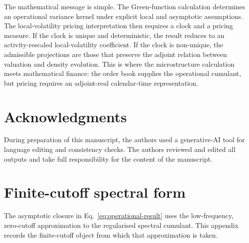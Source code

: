 \documentclass[11pt]{amsart}
\theoremstyle{definition}
\theoremstyle{plain}
\theoremstyle{remark}
\begin{document}
The mathematical message is simple. The Green-function calculation determines an operational variance kernel under explicit local and asymptotic assumptions. The local-volatility pricing interpretation then requires a clock and a pricing measure. If the clock is unique and deterministic, the result reduces to an activity-rescaled local-volatility coefficient. If the clock is non-unique, the admissible projections are those that preserve the adjoint relation between valuation and density evolution. This is where the microstructure calculation meets mathematical finance: the order book supplies the operational cumulant, but pricing requires an adjoint-real calendar-time representation.

\section*{Acknowledgments}
During preparation of this manuscript, the authors used a generative-AI tool for language editing and consistency checks. The authors reviewed and edited all outputs and take full responsibility for the content of the manuscript.




\appendix
\section{Finite-cutoff spectral form}
\label{app:finite-cutoff}
The asymptotic closure in Eq.~\eqref{eq:operational-result} uses the low-frequency, zero-cutoff approximation to the regularised spectral cumulant. This appendix records the finite-cutoff object from which that approximation is taken.
\end{document}
